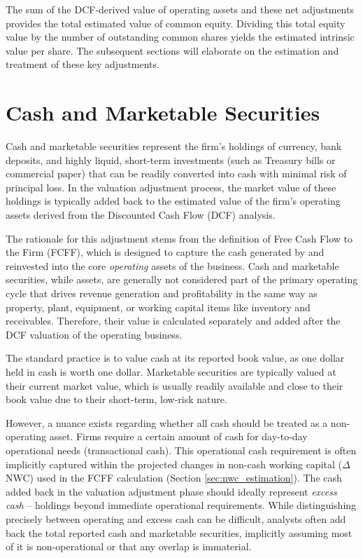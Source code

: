 The sum of the DCF-derived value of operating assets and these net adjustments provides the total estimated value of common equity. Dividing this total equity value by the number of outstanding common shares yields the estimated intrinsic value per share. The subsequent sections will elaborate on the estimation and treatment of these key adjustments.

\section{Cash and Marketable Securities}

Cash and marketable securities represent the firm's holdings of currency, bank deposits, and highly liquid, short-term investments (such as Treasury bills or commercial paper) that can be readily converted into cash with minimal risk of principal loss. In the valuation adjustment process, the market value of these holdings is typically added back to the estimated value of the firm's operating assets derived from the Discounted Cash Flow (DCF) analysis.

The rationale for this adjustment stems from the definition of Free Cash Flow to the Firm (FCFF), which is designed to capture the cash generated by and reinvested into the core \textit{operating} assets of the business. Cash and marketable securities, while assets, are generally not considered part of the primary operating cycle that drives revenue generation and profitability in the same way as property, plant, equipment, or working capital items like inventory and receivables. Therefore, their value is calculated separately and added after the DCF valuation of the operating business.

The standard practice is to value cash at its reported book value, as one dollar held in cash is worth one dollar. Marketable securities are typically valued at their current market value, which is usually readily available and close to their book value due to their short-term, low-risk nature.

However, a nuance exists regarding whether all cash should be treated as a non-operating asset. Firms require a certain amount of cash for day-to-day operational needs (transactional cash). This operational cash requirement is often implicitly captured within the projected changes in non-cash working capital (\(\Delta\) NWC) used in the FCFF calculation (Section \ref{sec:nwc_estimation}). The cash added back in the valuation adjustment phase should ideally represent \textit{excess cash} – holdings beyond immediate operational requirements. While distinguishing precisely between operating and excess cash can be difficult, analysts often add back the total reported cash and marketable securities, implicitly assuming most of it is non-operational or that any overlap is immaterial.

